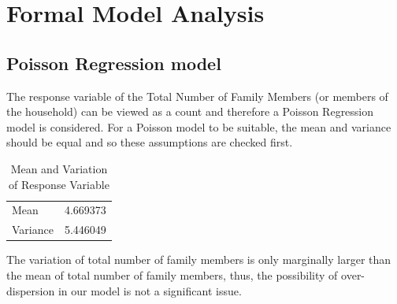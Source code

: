 \documentclass[
]{article}
\begin{document}
\newpage

\hypertarget{sec:FMA}{%
\section{Formal Model Analysis}\label{sec:FMA}}

\hypertarget{poisson-regression-model}{%
\subsection{Poisson Regression model}\label{poisson-regression-model}}

The response variable of the Total Number of Family Members (or members
of the household) can be viewed as a count and therefore a Poisson
Regression model is considered. For a Poisson model to be suitable, the
mean and variance should be equal and so these assumptions are checked
first.

\begin{table}

\caption{\label{tab:poisson mean and variance check}Mean and Variation of Response Variable}
\centering
\begin{tabular}[t]{l|r}
\hline
  & \\
\hline
Mean & 4.669373\\
\hline
Variance & 5.446049\\
\hline
\end{tabular}
\end{table}

The variation of total number of family members is only marginally
larger than the mean of total number of family members, thus, the
possibility of over-dispersion in our model is not a significant issue.
\end{document}
